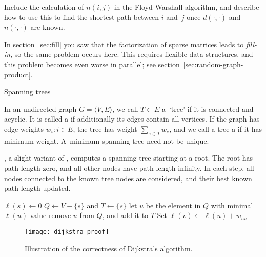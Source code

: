 \begin{exercise}
  Include the calculation of $n(i,j)$ in the Floyd-Warshall algorithm,
  and describe how to use this to find the shortest path between $i$
  and~$j$ once $d(\cdot,\cdot)$ and $n(\cdot,\cdot)$ are known.
\end{exercise}

In section~\ref{sec:fill} you saw that the factorization of sparse
matrices leads to \emph{fill-in},
so the same problem occurs here. This requires flexible data structures,
and this problem becomes even worse in parallel; see section~\ref{sec:random-graph-product}.


 {Spanning trees}
\label{sec:dijkstra}

In an undirected graph $G=\langle V,E\rangle$, we call $T\subset E$ a~`tree'
if it is connected and acyclic. It is called a 
if additionally its edges contain all vertices.
If the graph has edge weights
$w_i\colon i\in E$, the tree has weight $\sum_{e\in T} w_e$, and
we call a tree a  if it has minimum weight.
A~minimum spanning tree need not be unique.

, a slight variant of
, computes a spanning
tree starting at a root. The root has path length zero, and all other
nodes have path length infinity.
In each step, all nodes connected to the known tree
nodes are considered, and their best known path length updated.

\begin{displayalgorithm}
  $\ell(s)\leftarrow 0$\;
  $Q\leftarrow V-\{s\}$ and $T\leftarrow \{s\}$\;
   {
    let $u$ be the element in $Q$ with minimal $\ell(u)$ value\;
    remove $u$ from $Q$, and add it to $T$\;
     {
       {Set $\ell(v)\leftarrow \ell(u)+w_{uv}$}
    }
  }
\end{displayalgorithm}

\begin{figure}[ht]
  \texttt{[image: dijkstra-proof]}
  \caption{Illustration of the correctness of Dijkstra's algorithm.}
  \label{fig:dijkstra-proof}
\end{figure}


